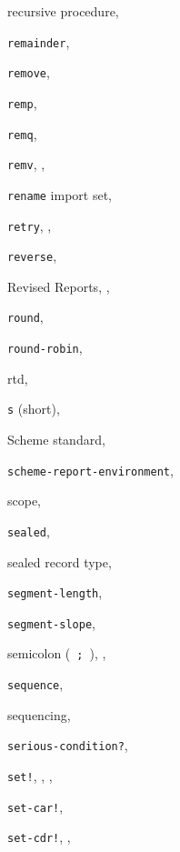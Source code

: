 {\begin{multicols}{2}
recursive procedure, \pageref{start_s132}
  
\texttt{remainder}, \textit{\pageref{objects_s98}}
  
\texttt{remove}, \textit{\pageref{objects_s53}}
  
\texttt{remp}, \textit{\pageref{objects_s54}}
  
\texttt{remq}, \textit{\pageref{objects_s53}}
  
\texttt{remv}, \pageref{start_s143}, \textit{\pageref{objects_s53}}
  
\texttt{rename} import set, \pageref{libraries_s12}
  
\texttt{retry}, \pageref{further_s65}, \pageref{further_s78}
  
\texttt{reverse}, \textit{\pageref{objects_s50}}
  
Revised Reports, \pageref{preface_s2}, \pageref{intro_s0}
  
\texttt{round}, \textit{\pageref{objects_s104}}
  
\texttt{round-robin}, \pageref{examples_s93}
  
rtd, \pageref{records_s18}
  
\texttt{s} (short), \pageref{objects_s82}
  
Scheme standard, \pageref{preface_s1}
  
\texttt{scheme-report-environment}, \textit{\pageref{control_s82}}
  
scope, \pageref{start_s55}
  
\texttt{sealed}, \textit{\pageref{records_s16}}
  
sealed record type, \pageref{records_s14}
  
\texttt{segment-length}, \pageref{control_s73}
  
\texttt{segment-slope}, \pageref{control_s74}
  
semicolon ( \texttt{;} ), \pageref{intro_s44}, \pageref{grammar_s7}
  
\texttt{sequence}, \pageref{syntax_s55}
  
sequencing, \pageref{control_s5}
  
\texttt{serious-condition?}, \textit{\pageref{exceptions_s19}}
  
\texttt{set!}, \pageref{start_s165}, \pageref{further_s8}, \textit{\pageref{binding_s28}}
  
\texttt{set-car!}, \textit{\pageref{objects_s40}}
  
\texttt{set-cdr!}, \pageref{start_s197}, \textit{\pageref{objects_s41}}
  

\end{multicols}}
